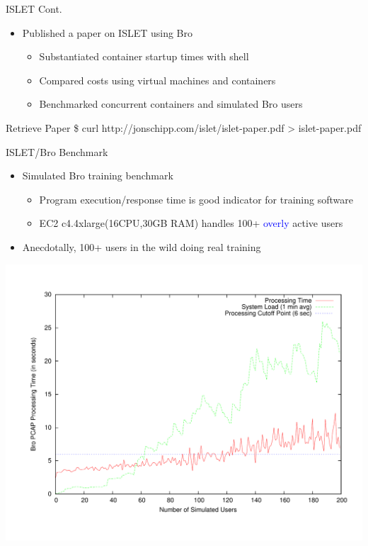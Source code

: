 \documentclass[xcolor=svgnames,handout]{beamer}
\begin{document}
\begin{frame}{ISLET Cont.}
  \begin{itemize}
    \item Published a paper on ISLET using Bro
  	\begin{itemize}
		\item Substantiated container startup times with shell
		\item Compared costs using virtual machines and containers
		\item Benchmarked concurrent containers and simulated Bro users
	\end{itemize}
  \end{itemize}
  \begin{exampleblock}{Retrieve Paper}
	\alert{\$ curl http://jonschipp.com/islet/islet-paper.pdf > islet-paper.pdf }
    \end{exampleblock}
\end{frame}

\begin{frame}{ISLET/Bro Benchmark}
  \begin{itemize}
    \item Simulated Bro training benchmark
    \begin{itemize}
      \item Program execution/response time is good indicator for training software
      \item EC2 c4.4xlarge(16CPU,30GB RAM) handles 100+ \textcolor{blue}{overly} active users
    \end{itemize}
      \item Anecdotally, 100+ users in the wild doing real training
  \end{itemize}
  \includegraphics[height=.75\textheight,width=1\textwidth]{container_simulation.pdf}
\end{frame}
\end{document}
